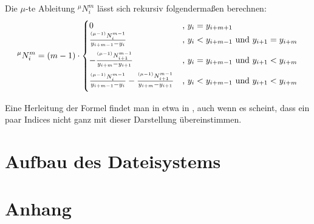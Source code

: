 \documentclass[11pt,a4paper,titlepage]{article}
\theoremstyle{plain} %
\theoremstyle{definition} %
\numberwithin{equation}{section} %
\begin{document}
	 Die $\mu$-te Ableitung $^\mu N_i^m$ lässt sich rekursiv  folgendermaßen berechnen:
	 \begin{equation}
		 ^\mu N_i^m = (m-1) \cdot \begin{cases}
			 0 &\mbox{, } y_i=y_{i+m+1}\\
			 \vspace*{0.2cm}
			 \frac{^{(\mu-1)}N_i^{m-1}}{y_{i+m-1}-y_i} & \mbox{, }  y_i<y_{i+m-1} \text{ und } y_{i+1}=y_{i+m}  \\
			  \vspace*{0.2cm}
			 -\frac{^{(\mu-1)}N_{i+1}^{m-1}}{y_{i+m}-y_{i+1}} & \mbox{, } 	y_i=y_{i+m-1}  \text{ und } y_{i+1}<y_{i+m}  \\
			  \vspace*{0.2cm}
			 \frac{^{(\mu-1)}N_i^{m-1}}{y_{i+m-1}-y_i}-\frac{^{(\mu-1)}N_{i+1}^{m-1}}{y_{i+m}-y_{i+1}}	&\mbox{, } y_i<y_{i+m-1}  \text{ und } y_{i+1}<y_{i+m}  \\	 
		 \end{cases}
	 \end{equation}
	
	Eine Herleitung der Formel findet man in etwa in \cite{LycheMorken}, auch wenn es scheint, dass ein paar Indices nicht ganz mit dieser Darstellung übereinstimmen.
	
	\section{Aufbau des Dateisystems}
	
	\section{Anhang}
	
		
		
				
		\newpage		
		
		\vspace{0.5cm}


	
		
\end{document}
